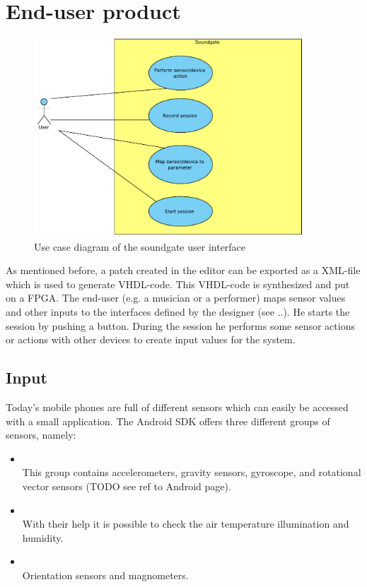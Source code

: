 \section{End-user product}

	\begin{figure}[!h]
		\centering
			\includegraphics[width=0.90\textwidth]{images/User_View.pdf}
		\caption{Use case diagram of the soundgate user interface}
		\label{fig:Soundgate_UserInterface}
	\end{figure}
	
	As mentioned before, a patch created in the editor can be exported as a XML-file which is used to generate VHDL-code. This VHDL-code is synthesized and put on a FPGA. The end-user (e.g. a musician or a performer) maps sensor values and other inputs to the interfaces defined by the designer (see ..). He starts the session by pushing a button. During the session he performs some sensor actions or actions with other devices to create input values for the system.
	
\subsection{Input}
Today's mobile phones are full of different sensors which can easily be accessed with a small application. The Android SDK offers three different groups of sensors, namely:
\begin{itemize}
	\item {} \\
			This group contains accelerometers, gravity sensors, gyroscope, and rotational vector sensors (TODO see ref to Android page). 
	\item {} \\
			With their help it is possible to check the air temperature illumination and humidity.
	\item {} \\
			Orientation sensors and magnometers.
\end{itemize}

